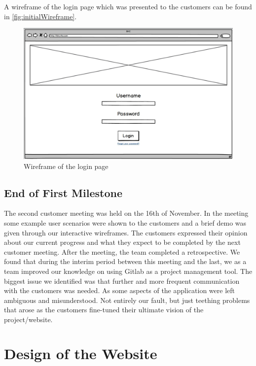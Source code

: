\documentclass{l3proj}
\begin{document}
A wireframe of the login page which was presented to the customers can be found in \autoref{fig:initialWireframe}.

\begin{figure}[ht]
\centerline{\includegraphics[width=\textwidth, height=\textheight, keepaspectratio]{wireframe.png}}
\caption{Wireframe of the login page}
\label{fig:initialWireframe}
\end{figure}

\subsection{End of First Milestone}
\label{sec:milestone1}

The second customer meeting was held on the 16th of November. In the meeting some example user scenarios were shown to the customers and a brief demo was given through our interactive wireframes. The customers expressed their opinion about our current progress and what they expect to be completed by the next customer meeting. After the meeting, the team completed a retrospective. We found that during the interim period between this meeting and the last, we as a team improved our knowledge on using Gitlab as a project management tool. The biggest issue we identified was that further and more frequent communication with the customers was needed. As some aspects of the application were left ambiguous and misunderstood. Not entirely our fault, but just teething problems that arose as the customers fine-tuned their ultimate vision of the project/website.

\section{Design of the Website}
\label{sec:design}
\end{document}
